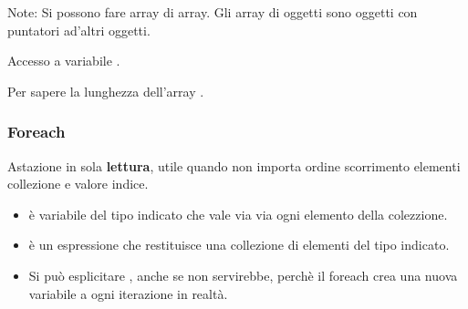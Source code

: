 Note: Si possono fare array di array. Gli array di oggetti sono oggetti con puntatori ad'altri oggetti.

Accesso a variabile .

Per sapere la lunghezza dell'array .

\subsubsection{Foreach}
Astazione  in sola \textbf{lettura}, utile quando non importa ordine scorrimento elementi collezione e valore indice.


\begin{itemize}
	\item {} è variabile del tipo indicato che vale via via ogni elemento della colezzione.
	\item {} è un espressione che restituisce una collezione di elementi del tipo indicato.
	\item Si può esplicitare , anche se non servirebbe, perchè il foreach crea una nuova variabile a ogni iterazione in realtà.
\end{itemize}